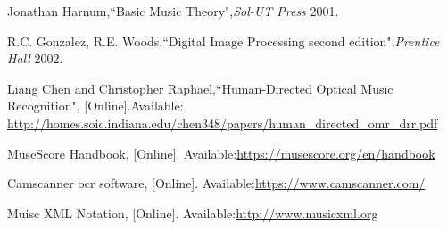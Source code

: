 \documentclass[journal]{IEEEtran}
\begin{document}
\begin{thebibliography}{1}
Jonathan Harnum,``Basic Music Theory",\emph{Sol-UT Press} 2001.

R.C. Gonzalez, R.E. Woods,``Digital Image Processing second edition",\emph{Prentice Hall} 2002.

Liang Chen and Christopher Raphael,``Human-Directed Optical Music Recognition", [Online].Available: \url{http://homes.soic.indiana.edu/chen348/papers/human_directed_omr_drr.pdf}

MuseScore Handbook, [Online]. Available:\url{https://musescore.org/en/handbook}

Camscanner ocr software, [Online]. Available:\url{https://www.camscanner.com/}


Muisc XML Notation, [Online]. Available:\url{http://www.musicxml.org}


\end{thebibliography}

% 







\end{document}
